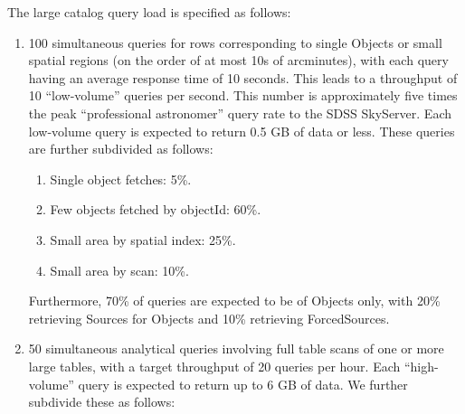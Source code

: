 \documentclass[DM,lsstdraft,toc]{lsstdoc}
\begin{document}
The large catalog query load is specified as follows:

\begin{enumerate}
\def\labelenumi{\arabic{enumi}.}
\item
  100 simultaneous queries for rows corresponding to single Objects or
  small spatial regions (on the order of at most 10s of arcminutes),
  with each query having an average response time of 10 seconds. This
  leads to a throughput of 10 ``low-volume'' queries per second. This
  number is approximately five times the peak ``professional
  astronomer'' query rate to the SDSS SkyServer. Each low-volume query
  is expected to return 0.5 GB of data or less. These queries are
  further subdivided as follows:

  \begin{enumerate}
  \def\labelenumii{\Alph{enumii}.}
  \item
    Single object fetches: 5\%.
  \item
    Few objects fetched by objectId: 60\%.
  \item
    Small area by spatial index: 25\%.
  \item
    Small area by scan: 10\%.
  \end{enumerate}

  Furthermore, 70\% of queries are expected to be of Objects only, with
  20\% retrieving Sources for Objects and 10\% retrieving ForcedSources.
\item
  50 simultaneous analytical queries involving full table scans of one
  or more large tables, with a target throughput of 20 queries per hour.
  Each ``high-volume'' query is expected to return up to 6 GB of data.
  We further subdivide these as follows:


\end{enumerate}
\end{document}
